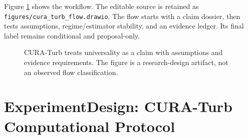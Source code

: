 \documentclass[conference]{../../../../Conference-LaTeX-template_10-17-19/IEEEtran}
\begin{document}
Figure \ref{fig:cura} shows the workflow. The editable source is retained as \texttt{figures/cura\_turb\_flow.drawio}. The flow starts with a claim dossier, then tests assumptions, regime/estimator stability, and an evidence ledger. Its final label remains conditional and proposal-only.

\begin{figure}[!t]
\centering
{}
\caption{CURA-Turb treats universality as a claim with assumptions and evidence requirements. The figure is a research-design artifact, not an observed flow classification.}
\label{fig:cura}
\end{figure}

\section{ExperimentDesign: CURA-Turb Computational Protocol}
\end{document}
